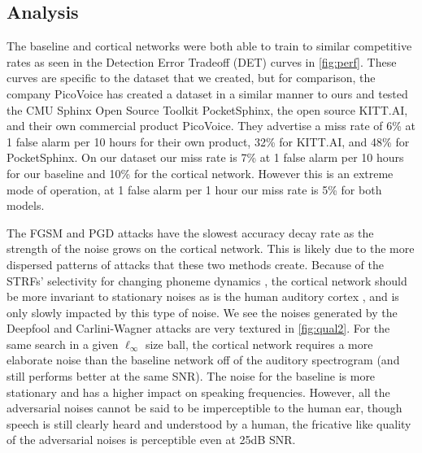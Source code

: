 \documentclass{article}
\begin{document}








\subsection{Analysis}

The baseline and cortical networks were both able to train to similar competitive rates as seen in the Detection Error Tradeoff (DET) curves in \cref{fig:perf}.
These curves are specific to the dataset that we created, but for comparison,
the company PicoVoice has created a dataset in a similar manner to ours and tested the CMU Sphinx Open Source Toolkit PocketSphinx, the open source KITT.AI, and their own commercial product PicoVoice.
They advertise a miss rate of 6\% at 1 false alarm per 10 hours for their own product, 32\% for KITT.AI, and 48\% for PocketSphinx.
On our dataset our miss rate is 7\% at 1 false alarm per 10 hours for our baseline and 10\% for the cortical network.
However this is an extreme mode of operation, at 1 false alarm per 1 hour our miss rate is 5\% for both models.

The FGSM and PGD attacks have the slowest accuracy decay rate as the strength of the noise grows on the cortical network.
This is likely due to the more dispersed patterns of attacks that these two methods create.
Because of the STRFs' selectivity for changing phoneme dynamics \cite{mesgarani_2011}, the cortical network should be more invariant to stationary noises as is the human auditory cortex \cite{khalighinejad_2019}, and is only slowly impacted by this type of noise.
We see the noises generated by the Deepfool and Carlini-Wagner attacks are very textured in \cref{fig:qual2}.
For the same search in a given $\ell_\infty$ size ball, the cortical network requires a more elaborate noise than the baseline network off of the auditory spectrogram (and still performs better at the same SNR).
The noise for the baseline is more stationary and has a higher impact on speaking frequencies.
However, all the adversarial noises cannot be said to be imperceptible to the human ear, though speech is still clearly heard and understood by a human, the fricative like quality of the adversarial noises is perceptible even at 25dB SNR.
\end{document}
